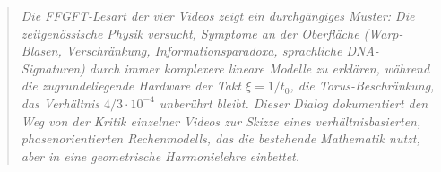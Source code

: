 \begin{quote}
\itshape
Die FFGFT-Lesart der vier Videos zeigt ein durchg\"angiges Muster: Die zeitgen\"ossische Physik versucht, Symptome an der Oberfl\"ache (Warp-Blasen, Verschr\"ankung, Informationsparadoxa, sprachliche DNA-Signaturen) durch immer komplexere lineare Modelle zu erkl\"aren, w\"ahrend die zugrundeliegende Hardware \textendash{} der Takt $\xi = 1/t_0$, die Torus-Beschr\"ankung, das Verh\"altnis $4/3 \cdot 10^{-4}$ \textendash{} unber\"uhrt bleibt. Dieser Dialog dokumentiert den Weg von der Kritik einzelner Videos zur Skizze eines verh\"altnisbasierten, phasenorientierten Rechenmodells, das die bestehende Mathematik nutzt, aber in eine geometrische Harmonielehre einbettet.
\end{quote}

